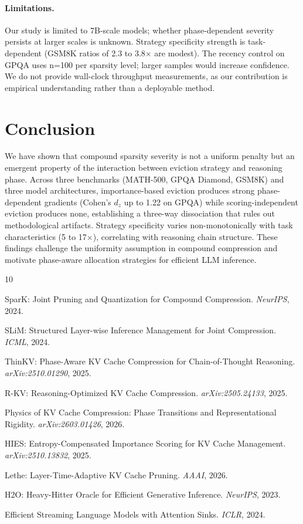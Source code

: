 \documentclass[11pt,a4paper]{article}
\begin{document}
\paragraph{Limitations.}
Our study is limited to 7B-scale models; whether phase-dependent severity persists at larger scales is unknown. Strategy specificity strength is task-dependent (GSM8K ratios of 2.3 to 3.8$\times$ are modest). The recency control on GPQA uses n=100 per sparsity level; larger samples would increase confidence. We do not provide wall-clock throughput measurements, as our contribution is empirical understanding rather than a deployable method.

\section{Conclusion}

We have shown that compound sparsity severity is not a uniform penalty but an emergent property of the interaction between eviction strategy and reasoning phase. Across three benchmarks (MATH-500, GPQA Diamond, GSM8K) and three model architectures, importance-based eviction produces strong phase-dependent gradients (Cohen's $d_z$ up to 1.22 on GPQA) while scoring-independent eviction produces none, establishing a three-way dissociation that rules out methodological artifacts. Strategy specificity varies non-monotonically with task characteristics (5 to 17$\times$), correlating with reasoning chain structure. These findings challenge the uniformity assumption in compound compression and motivate phase-aware allocation strategies for efficient LLM inference.


\begin{thebibliography}{10}

SparK: Joint Pruning and Quantization for Compound Compression.
\textit{NeurIPS}, 2024.

SLiM: Structured Layer-wise Inference Management for Joint Compression.
\textit{ICML}, 2024.

ThinKV: Phase-Aware KV Cache Compression for Chain-of-Thought Reasoning.
\textit{arXiv:2510.01290}, 2025.

R-KV: Reasoning-Optimized KV Cache Compression.
\textit{arXiv:2505.24133}, 2025.

Physics of KV Cache Compression: Phase Transitions and Representational Rigidity.
\textit{arXiv:2603.01426}, 2026.

HIES: Entropy-Compensated Importance Scoring for KV Cache Management.
\textit{arXiv:2510.13832}, 2025.

Lethe: Layer-Time-Adaptive KV Cache Pruning.
\textit{AAAI}, 2026.

H2O: Heavy-Hitter Oracle for Efficient Generative Inference.
\textit{NeurIPS}, 2023.

Efficient Streaming Language Models with Attention Sinks.
\textit{ICLR}, 2024.

\end{thebibliography}
\end{document}
